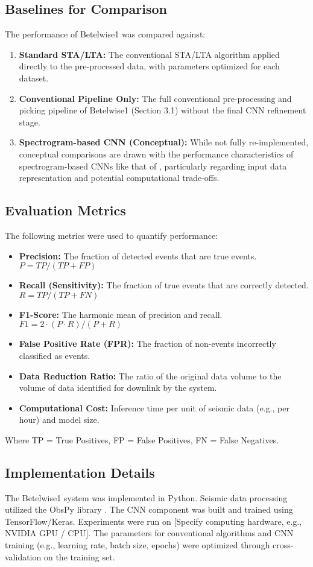 \documentclass[11pt,a4paper]{article}
\begin{document}
\subsection{Baselines for Comparison}
The performance of Betelwise1 was compared against:
\begin{enumerate}
    \item \textbf{Standard STA/LTA:} The conventional STA/LTA algorithm applied directly to the pre-processed data, with parameters optimized for each dataset.
    \item \textbf{Conventional Pipeline Only:} The full conventional pre-processing and picking pipeline of Betelwise1 (Section 3.1) without the final CNN refinement stage.
    \item \textbf{Spectrogram-based CNN (Conceptual):} While not fully re-implemented, conceptual comparisons are drawn with the performance characteristics of spectrogram-based CNNs like that of \citet{civilini2021detecting}, particularly regarding input data representation and potential computational trade-offs.
\end{enumerate}

\subsection{Evaluation Metrics}
The following metrics were used to quantify performance:
\begin{itemize}
    \item \textbf{Precision:} The fraction of detected events that are true events.
    $P = TP / (TP + FP)$
    \item \textbf{Recall (Sensitivity):} The fraction of true events that are correctly detected.
    $R = TP / (TP + FN)$
    \item \textbf{F1-Score:} The harmonic mean of precision and recall.
    $F1 = 2 \cdot (P \cdot R) / (P + R)$
    \item \textbf{False Positive Rate (FPR):} The fraction of non-events incorrectly classified as events.
    \item \textbf{Data Reduction Ratio:} The ratio of the original data volume to the volume of data identified for downlink by the system.
    \item \textbf{Computational Cost:} Inference time per unit of seismic data (e.g., per hour) and model size.
\end{itemize}
Where TP = True Positives, FP = False Positives, FN = False Negatives.

\subsection{Implementation Details}
The Betelwise1 system was implemented in Python. Seismic data processing utilized the ObsPy library \citep{obspy2010}. The CNN component was built and trained using TensorFlow/Keras. Experiments were run on [Specify computing hardware, e.g., NVIDIA GPU / CPU]. The parameters for conventional algorithms and CNN training (e.g., learning rate, batch size, epochs) were optimized through cross-validation on the training set.
\end{document}
